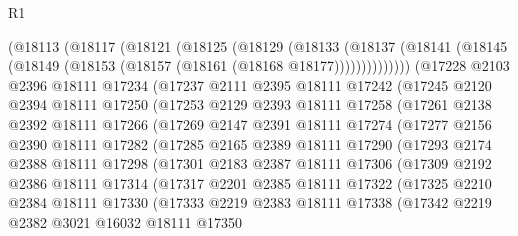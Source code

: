 \begin{lexlean}{R1}
\begin{coremodule}
        (@18113
          (@18117
            (@18121
              (@18125
                (@18129
                  (@18133
                    (@18137
                      (@18141 (@18145 (@18149 (@18153 (@18157 (@18161 (@18168 @18177))))))))))))))
        (@17228
          @2103
          @2396
          @18111
          @17234
          (@17237
            @2111
            @2395
            @18111
            @17242
            (@17245
              @2120
              @2394
              @18111
              @17250
              (@17253
                @2129
                @2393
                @18111
                @17258
                (@17261
                  @2138
                  @2392
                  @18111
                  @17266
                  (@17269
                    @2147
                    @2391
                    @18111
                    @17274
                    (@17277
                      @2156
                      @2390
                      @18111
                      @17282
                      (@17285
                        @2165
                        @2389
                        @18111
                        @17290
                        (@17293
                          @2174
                          @2388
                          @18111
                          @17298
                          (@17301
                            @2183
                            @2387
                            @18111
                            @17306
                            (@17309
                              @2192
                              @2386
                              @18111
                              @17314
                              (@17317
                                @2201
                                @2385
                                @18111
                                @17322
                                (@17325
                                  @2210
                                  @2384
                                  @18111
                                  @17330
                                  (@17333
                                    @2219
                                    @2383
                                    @18111
                                    @17338
                                    (@17342
                                      @2219
                                      @2382
                                      @3021
                                      @16032
                                      @18111
                                      @17350

\end{coremodule}
\end{lexlean}
